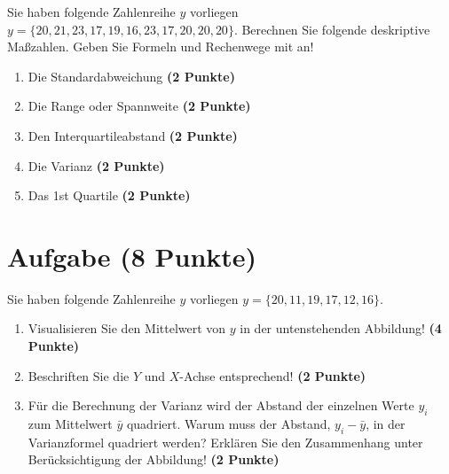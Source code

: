 \documentclass[a4paper, 10pt]{scrartcl}\usepackage[]{graphicx}\usepackage[]{xcolor}
\begin{document}
Sie haben folgende Zahlenreihe $y$ vorliegen
$y = \{20, 21, 23, 17, 19, 16, 23, 17, 20, 20, 20\}$. Berechnen Sie folgende
deskriptive Ma{\ss}zahlen. Geben Sie Formeln und Rechenwege mit an!



\begin{enumerate}
\item Die Standardabweichung \textbf{(2 Punkte)}
\item Die Range oder Spannweite \textbf{(2 Punkte)}
\item Den Interquartileabstand \textbf{(2 Punkte)}
\item Die Varianz \textbf{(2 Punkte)}
\item Das 1st Quartile \textbf{(2 Punkte)}
\end{enumerate}
 
\clearpage

\section{Aufgabe \hfill (8 Punkte)}

Sie haben folgende Zahlenreihe $y$ vorliegen
$y = \{20, 11, 19, 17, 12, 16\}$.

\begin{enumerate}
\item Visualisieren Sie den Mittelwert von $y$ in der untenstehenden
  Abbildung! \textbf{(4 Punkte)}
\item Beschriften Sie die $Y$ und $X$-Achse entsprechend! \textbf{(2 Punkte)}
\item F{\"u}r die Berechnung der Varianz wird der Abstand der einzelnen Werte $y_i$
  zum Mittelwert $\bar{y}$ quadriert. Warum muss der Abstand, $y_i -
  \bar{y}$, in der Varianzformel quadriert werden?
  Erkl{\"a}ren Sie den Zusammenhang unter Ber{\"u}cksichtigung der Abbildung!
  \textbf{(2 Punkte)}  
\end{enumerate}
\end{document}

